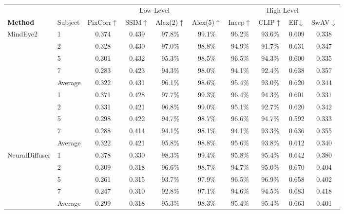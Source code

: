 \documentclass[conference]{IEEEtran}
\begin{document}
\begin{table}[p]
\vspace{2.5em}
\begin{tabular*}{\textwidth}{@{\extracolsep{\fill}}p{2.7cm}p{1.4cm}cccccccc@{}}
\toprule
& & \multicolumn{4}{c}{Low-Level} & \multicolumn{4}{c}{High-Level} \\
\cmidrule(lr){3-6}\cmidrule(lr){7-10}
\textbf{Method} & Subject
& PixCorr$\uparrow$ & SSIM$\uparrow$ & Alex(2)$\uparrow$ & Alex(5)$\uparrow$
& Incep$\uparrow$ & CLIP$\uparrow$ & Eff$\downarrow$ & SwAV$\downarrow$ \\
\midrule
\multirow{6}{*}{MindEye2 \cite{scotti2024mindeye2sharedsubjectmodelsenable}} & 1 & 0.374 & 0.439 & 97.8\% & 99.1\% & 96.2\% & 93.6\% & 0.609 & 0.338 \\
 & 2 & 0.328 & 0.430 & 97.0\% & 98.8\% & 94.9\% & 91.7\% & 0.631 & 0.347 \\
 & 5 & 0.301 & 0.432 & 95.3\% & 98.5\% & 96.5\% & 94.3\% & 0.600 & 0.335 \\
 & 7 & 0.283 & 0.423 & 94.3\% & 98.0\% & 94.1\% & 92.4\% & 0.638 & 0.357 \\
\cmidrule(l){2-10}
 & Average & 0.322 & 0.431 & 96.1\% & 98.6\% & 95.4\% & 93.0\% & 0.620 & 0.344 \\
\midrule
\multirow{6}{*}{MindTuner \cite{gong2024mindtunercrosssubjectvisualdecoding}} & 1 & 0.371 & 0.428 & 97.7\% & 99.3\% & 96.4\% & 94.3\% & 0.601 & 0.331 \\
 & 2 & 0.331 & 0.421 & 96.8\% & 99.0\% & 95.1\% & 92.7\% & 0.620 & 0.342 \\
 & 5 & 0.298 & 0.422 & 94.7\% & 98.7\% & 96.6\% & 94.7\% & 0.592 & 0.333 \\
 & 7 & 0.288 & 0.414 & 94.1\% & 98.1\% & 94.1\% & 93.3\% & 0.636 & 0.355 \\
\cmidrule(l){2-10}
 & Average & 0.322 & 0.421 & 95.8\% & 98.8\% & 95.6\% & 93.8\% & 0.612 & 0.340 \\
\midrule
\multirow{6}{*}{NeuralDiffuser \cite{Li_2025}} & 1 & 0.378 & 0.330 & 98.3\% & 99.4\% & 95.8\% & 95.4\% & 0.642 & 0.380 \\
 & 2 & 0.309 & 0.318 & 96.6\% & 98.7\% & 94.7\% & 95.0\% & 0.670 & 0.404 \\
 & 5 & 0.261 & 0.315 & 93.7\% & 97.9\% & 96.5\% & 96.9\% & 0.658 & 0.402 \\
 & 7 & 0.247 & 0.310 & 92.8\% & 97.1\% & 94.6\% & 94.5\% & 0.683 & 0.418 \\
\cmidrule(l){2-10}
 & Average & 0.299 & 0.318 & 95.3\% & 98.3\% & 95.4\% & 95.4\% & 0.663 & 0.401 \\
\midrule

\end{tabular*}
\end{table}
\end{document}
